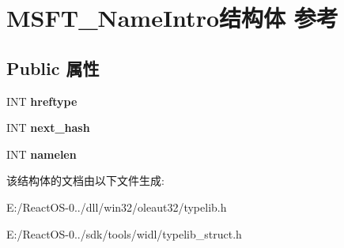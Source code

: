 \hypertarget{struct_m_s_f_t___name_intro}{}\section{M\+S\+F\+T\+\_\+\+Name\+Intro结构体 参考}
\label{struct_m_s_f_t___name_intro}
\subsection*{Public 属性}
\begin{DoxyCompactItemize}
\item 
\mbox{\label{struct_m_s_f_t___name_intro_a4b2c80da7b42bdaa4ace9a5a1a792476}} 
I\+NT {\bfseries hreftype}
\item 
\mbox{\label{struct_m_s_f_t___name_intro_a29c3b5bceeeddabcb71b964db6174a96}} 
I\+NT {\bfseries next\+\_\+hash}
\item 
\mbox{\label{struct_m_s_f_t___name_intro_a08129aa6dc1c528ef16a4f6fb9b8ae03}} 
I\+NT {\bfseries namelen}
\end{DoxyCompactItemize}


该结构体的文档由以下文件生成\+:\begin{DoxyCompactItemize}
\item 
E\+:/\+React\+O\+S-\/0../dll/win32/oleaut32/typelib.\+h\item 
E\+:/\+React\+O\+S-\/0../sdk/tools/widl/typelib\+\_\+struct.\+h\end{DoxyCompactItemize}
